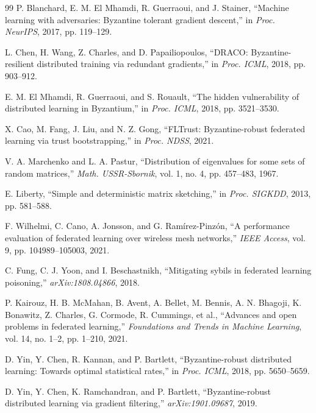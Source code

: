 \documentclass[runningheads]{llncs}
\begin{document}
\begin{thebibliography}{99}
 P. Blanchard, E. M. El Mhamdi, R. Guerraoui, and J. Stainer, ``Machine learning with adversaries: Byzantine tolerant gradient descent,'' in \textit{Proc. NeurIPS}, 2017, pp. 119--129.

 L. Chen, H. Wang, Z. Charles, and D. Papailiopoulos, ``DRACO: Byzantine-resilient distributed training via redundant gradients,'' in \textit{Proc. ICML}, 2018, pp. 903--912.

 E. M. El Mhamdi, R. Guerraoui, and S. Rouault, ``The hidden vulnerability of distributed learning in Byzantium,'' in \textit{Proc. ICML}, 2018, pp. 3521--3530.

 X. Cao, M. Fang, J. Liu, and N. Z. Gong, ``FLTrust: Byzantine-robust federated learning via trust bootstrapping,'' in \textit{Proc. NDSS}, 2021.

 V. A. Marchenko and L. A. Pastur, ``Distribution of eigenvalues for some sets of random matrices,'' \textit{Math. USSR-Sbornik}, vol. 1, no. 4, pp. 457--483, 1967.

 E. Liberty, ``Simple and deterministic matrix sketching,'' in \textit{Proc. SIGKDD}, 2013, pp. 581--588.

 F. Wilhelmi, C. Cano, A. Jonsson, and G. Ramírez-Pinzón, ``A performance evaluation of federated learning over wireless mesh networks,'' \textit{IEEE Access}, vol. 9, pp. 104989--105003, 2021.

 C. Fung, C. J. Yoon, and I. Beschastnikh, ``Mitigating sybils in federated learning poisoning,'' \textit{arXiv:1808.04866}, 2018.

 P. Kairouz, H. B. McMahan, B. Avent, A. Bellet, M. Bennis, A. N. Bhagoji, K. Bonawitz, Z. Charles, G. Cormode, R. Cummings, et al., ``Advances and open problems in federated learning,'' \textit{Foundations and Trends in Machine Learning}, vol. 14, no. 1--2, pp. 1--210, 2021.

 D. Yin, Y. Chen, R. Kannan, and P. Bartlett, ``Byzantine-robust distributed learning: Towards optimal statistical rates,'' in \textit{Proc. ICML}, 2018, pp. 5650--5659.

 D. Yin, Y. Chen, K. Ramchandran, and P. Bartlett, ``Byzantine-robust distributed learning via gradient filtering,'' \textit{arXiv:1901.09687}, 2019.


\end{thebibliography}
\end{document}
